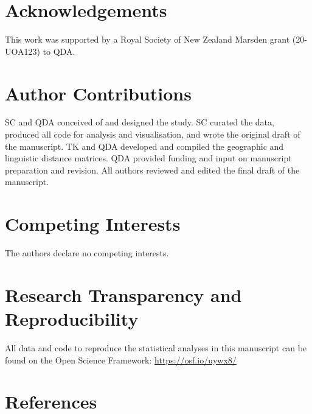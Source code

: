 \documentclass[
  man,floatsintext]{apa6}
\begin{document}
\newpage

\hypertarget{acknowledgements}{%
\section{Acknowledgements}\label{acknowledgements}}

This work was supported by a Royal Society of New Zealand Marsden grant (20-UOA123) to QDA.

\hypertarget{author-contributions}{%
\section{Author Contributions}\label{author-contributions}}

SC and QDA conceived of and designed the study. SC curated the data, produced all code for analysis and visualisation, and wrote the original draft of the manuscript. TK and QDA developed and compiled the geographic and linguistic distance matrices. QDA provided funding and input on manuscript preparation and revision. All authors reviewed and edited the final draft of the manuscript.

\hypertarget{competing-interests}{%
\section{Competing Interests}\label{competing-interests}}

The authors declare no competing interests.

\hypertarget{research-transparency-and-reproducibility}{%
\section{Research Transparency and Reproducibility}\label{research-transparency-and-reproducibility}}

All data and code to reproduce the statistical analyses in this manuscript can be found on the Open Science Framework: \url{https://osf.io/uywx8/}

\newpage

\hypertarget{references}{%
\section{References}\label{references}}

\begingroup
\end{document}
